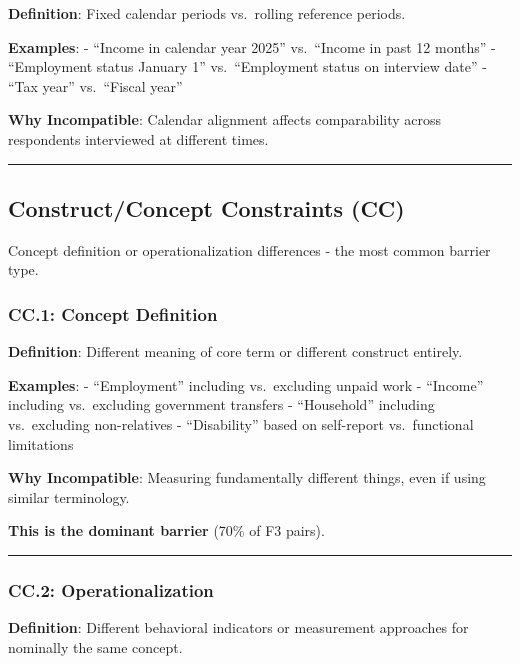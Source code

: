 \documentclass[
  letterpaper,
]{report}
\begin{document}
\textbf{Definition}: Fixed calendar periods vs.~rolling reference
periods.

\textbf{Examples}: - ``Income in calendar year 2025'' vs.~``Income in
past 12 months'' - ``Employment status January 1'' vs.~``Employment
status on interview date'' - ``Tax year'' vs.~``Fiscal year''

\textbf{Why Incompatible}: Calendar alignment affects comparability
across respondents interviewed at different times.

\begin{center}\rule{0.5\linewidth}{0.5pt}\end{center}

\subsection{Construct/Concept Constraints
(CC)}\label{constructconcept-constraints-cc}

Concept definition or operationalization differences - the most common
barrier type.

\subsubsection{CC.1: Concept Definition}\label{cc.1-concept-definition}

\textbf{Definition}: Different meaning of core term or different
construct entirely.

\textbf{Examples}: - ``Employment'' including vs.~excluding unpaid work
- ``Income'' including vs.~excluding government transfers -
``Household'' including vs.~excluding non-relatives - ``Disability''
based on self-report vs.~functional limitations

\textbf{Why Incompatible}: Measuring fundamentally different things,
even if using similar terminology.

\textbf{This is the dominant barrier} (70\% of F3 pairs).

\begin{center}\rule{0.5\linewidth}{0.5pt}\end{center}

\subsubsection{CC.2: Operationalization}\label{cc.2-operationalization}

\textbf{Definition}: Different behavioral indicators or measurement
approaches for nominally the same concept.
\end{document}
